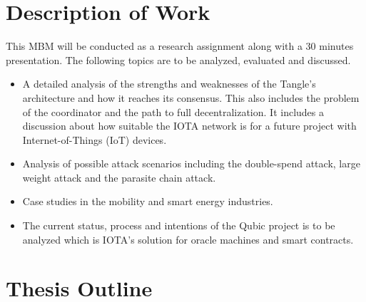 \section{Description of Work}
This MBM will be conducted as a research assignment along with a 30 minutes presentation. The following topics are to be analyzed, evaluated and discussed.
\begin{itemize}
    \item A detailed analysis of the strengths and weaknesses of the Tangle's architecture and how it reaches its consensus. This also includes the problem of the coordinator and the path to full decentralization. It includes a discussion about how suitable the IOTA network is for a future project with Internet-of-Things (IoT) devices.
    \item Analysis of possible attack scenarios including the double-spend attack, large weight attack and the parasite chain attack.
    \item Case studies in the mobility and smart energy industries.
    \item The current status, process and intentions of the Qubic project is to be analyzed which is IOTA's solution for oracle machines and smart contracts.
\end{itemize}

\section{Thesis Outline}

